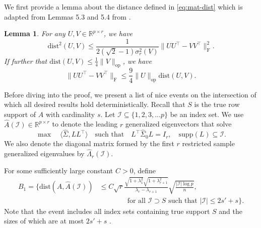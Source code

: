 \documentclass[11pt]{article}
\newcommand{\cI}{{\mathcal{I}}}
\newcommand{\0}{{\mathbf{0}}}
\newcommand{\op}{{\mathrm{op}}}
\newtheorem{lemma}[theorem]{Lemma}
\begin{document}
We first provide a lemma about the distance defined in \eqref{eq:mat-dist} which is adapted from Lemmas 5.3 and 5.4 from \cite{tu2015low}.
\iffalse
\begin{lemma}
For the subspace distance defined in \eqref{eq:mat-dist}, if $U,V\in \mathcal{O}(p,r)$, we have\begin{equation*}
    \mathrm{dist}(U,V)=\frac{1}{2}\|\Pi_U-\Pi_V\|_\mathrm{F}^2,
\end{equation*}
where $\Pi_U, \Pi_V$ denote the projection matrix onto column space of $U, V$ respectively. 
\end{lemma}
\fi
\begin{lemma}\label{sub dis lemma}
For any $U,V\in \mathbb{R}^{p\times r}$, we have\begin{equation*}
    \mathrm{dist}^2(U,V)\leq \frac{1}{2(\sqrt{2}-1)\sigma_r^2(V)}\|UU^\top  -VV^\top  \|_\mathrm{F}^2.
\end{equation*}
If further that $\mathrm{dist}(U,V)\leq\frac{1}{4}\|V\|_\op$, we have\begin{equation*}
    \|UU^\top  -VV^\top  \|_\mathrm{F}\leq\frac{9}{4}\|U\|_\op\mathrm{dist}(U,V).
\end{equation*}
\end{lemma}


Before diving into the proof, we present a list of nice events  on the intersection of which all desired results hold deterministically. 
Recall that $S$ is the true row support of $A$ with cardinality $s$. 
Let $\cI\subseteq \{1,2,3,...p\}$ be an index set. 
We use $\widehat{A}(\mathcal{I})\in\mathbb{R}^{p\times r}$ to denote the leading $r$ generalized eigenvectors that solve 
\begin{equation}\label{def: restricted eigenspace}
    \max \quad\langle\widehat{\Sigma}, LL^\top   \rangle\quad \text{such that} \quad L^\top  \widehat{\Sigma}_{0}L=I_r,\quad\mathrm{supp}(L)\subseteq \mathcal{I}.
\end{equation}
We also denote the diagonal matrix formed by the first $r$ restricted sample generalized eigenvalues by $\widehat{\Lambda}_r(\mathcal{I})$.

 For some sufficiently large constant $C>0$, define
\begin{equation}
      \label{eq:event-B1}
\begin{aligned}
B_1  = \bigg\{\mathrm{dist}(A, \widehat{A}(\cI))
& \leq C\sqrt{r}\frac{\sqrt{1+\lambda_1^2}\sqrt{{1+\lambda_{r+1}^2}}}{\lambda_r-\lambda_{r+1}}\sqrt{\frac{|\cI|\log p}{n}},\\
& \qquad\qquad \mbox{for all $\cI\supset S$ such that $|\cI|\leq 2s'+s$}
\bigg\}.    
\end{aligned}
\end{equation}
Note that the event includes all index sets containing true support $S$ and the sizes of which are at most $2s'+s$ .
\end{document}
